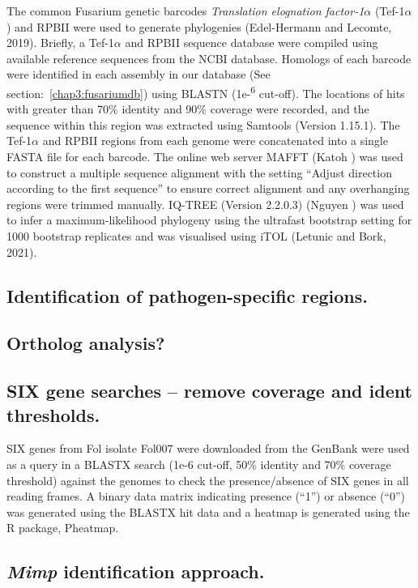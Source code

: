 The common Fusarium genetic barcodes \textit{Translation elognation factor-1\(\alpha\)} (Tef-1\(\alpha\)) and RPBII were used to generate phylogenies (Edel-Hermann and Lecomte, 2019). Briefly, a Tef-1\(\alpha\) and RPBII sequence database were compiled using available reference sequences from the NCBI database. Homologs of each barcode were identified in each assembly in our database (See section:~\ref{chap3:fusariumdb}) using BLASTN (1e-\textsuperscript{6} cut-off). The locations of hits with greater than 70\% identity and 90\% coverage were recorded, and the sequence within this region was extracted using Samtools (Version 1.15.1). The Tef-1\(\alpha\) and RPBII regions from each genome were concatenated into a single FASTA file for each barcode. The online web server MAFFT (Katoh ) was used to construct a multiple sequence alignment with the setting “Adjust direction according to the first sequence” to ensure correct alignment and any overhanging regions were trimmed manually. IQ-TREE (Version 2.2.0.3) (Nguyen ) was used to infer a maximum-likelihood phylogeny using the ultrafast bootstrap setting for 1000 bootstrap replicates and was visualised using iTOL (Letunic and Bork, 2021). 

\subsection{Identification of pathogen-specific regions.}


\subsection{Ortholog analysis?}

\subsection{SIX gene searches – remove coverage and ident thresholds.}
SIX genes from Fol isolate Fol007 were downloaded from the GenBank were used as a query in a BLASTX search (1e-6 cut-off, 50\% identity and 70\% coverage threshold) against the genomes to check the presence/absence of SIX genes in all reading frames. A binary data matrix indicating presence (“1”) or absence (“0”) was generated using the BLASTX hit data and a heatmap is generated using the R package, Pheatmap.

\subsection{\textit{Mimp} identification approach.}

